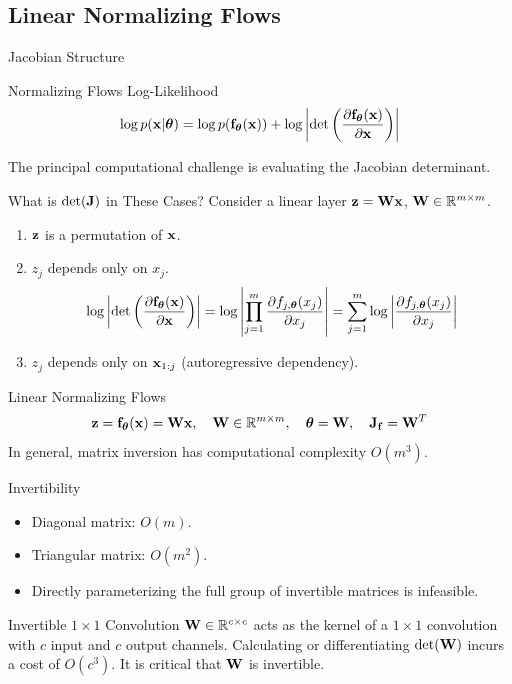 \documentclass{beamer}
\begin{document}
\subsection{Linear Normalizing Flows}
\begin{frame}{Jacobian Structure}
	\begin{block}{Normalizing Flows Log-Likelihood}
		\[
			\log p(\mathbf{x}|\boldsymbol{\theta}) = \log p(\mathbf{f}_{\boldsymbol{\theta}}(\mathbf{x})) + \log \left|\det \left( \frac{\partial \mathbf{f}_{\boldsymbol{\theta}}(\mathbf{x})}{\partial \mathbf{x}} \right) \right|
		\]
	\end{block}
	The principal computational challenge is evaluating the Jacobian determinant.
	\begin{block}{What is $\det(\mathbf{J})$ in These Cases?}
		Consider a linear layer $\mathbf{z} = \mathbf{W} \mathbf{x}$, $\mathbf{W} \in \mathbb{R}^{m \times m}$.
		\begin{enumerate}
			\item $\mathbf{z}$ is a permutation of $\mathbf{x}$.
			\item $z_j$ depends only on $x_j$. 
			\vspace{-0.3cm}
			\[
				\log \left|\det \left( \frac{\partial \mathbf{f}_{\boldsymbol{\theta}}(\mathbf{x})}{\partial \mathbf{x}} \right) \right| = \log \left| \prod_{j=1}^m \frac{\partial f_{j, \boldsymbol{\theta}}(x_j)}{\partial x_j} \right| = \sum_{j=1}^m \log \left|  \frac{\partial f_{j, \boldsymbol{\theta}}(x_j)}{\partial x_j} \right|
			\]
			\item $z_j$ depends only on $\mathbf{x}_{1:j}$ (autoregressive dependency).
		\end{enumerate}
	\end{block}
\end{frame}
\begin{frame}{Linear Normalizing Flows}
	\[
		\mathbf{z} = \mathbf{f}_{\boldsymbol{\theta}}(\mathbf{x}) = \mathbf{W} \mathbf{x}, \quad \mathbf{W} \in \mathbb{R}^{m \times m}, \quad \boldsymbol{\theta} = \mathbf{W}, \quad \mathbf{J}_{\mathbf{f}} = \mathbf{W}^T
	\]
	In general, matrix inversion has computational complexity $O(m^3)$.
	\begin{block}{Invertibility}
		\begin{itemize}
			\item Diagonal matrix: $O(m)$.
			\item Triangular matrix: $O(m^2)$.
			\item Directly parameterizing the full group of invertible matrices is infeasible.
		\end{itemize}
	\end{block}
	\begin{block}{Invertible $1 \times 1$ Convolution}
		$\mathbf{W} \in \mathbb{R}^{c \times c}$ acts as the kernel of a $1 \times 1$ convolution with $c$ input and $c$ output channels. 
		Calculating or differentiating $\det (\mathbf{W})$ incurs a cost of $O(c^3)$.
		It is critical that $\mathbf{W}$ is invertible.
	\end{block}
	
\end{frame}
\end{document}
